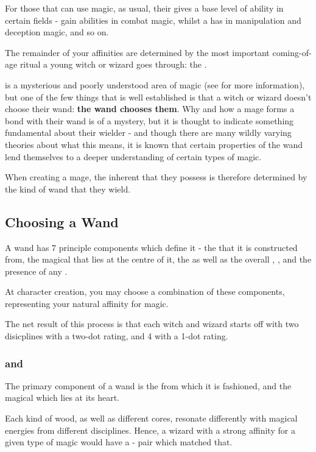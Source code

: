 For those that can use magic, as usual, their  gives a base level of ability in certain fields -  gain abilities in combat magic, whilst a  has  in manipulation and deception magic, and so on. 

The remainder of your affinities are determined by the most important coming-of-age ritual a young witch or wizard goes through: the . 

 is a mysterious and poorly understood area of magic (see \pageref{S:Wandlore} for more information), but one of the few things that is well established is that a witch or wizard doesn't choose their wand: {\bf the wand chooses them}. Why and how a mage forms a bond with their wand is of a mystery, but it is thought to indicate something fundamental about their wielder - and though there are many wildly varying theories about what this means, it is known that certain properties of the wand lend themselves to a deeper understanding of certain types of magic. 

When creating a mage, the inherent  that they possess is therefore determined by the kind of wand that they wield. 

\subsection{Choosing a Wand}

A wand has 7 principle components which define it - the  that it is constructed from, the magical  that lies at the centre of it, the  as well as the overall , ,  and the presence of any . 

At character creation, you may choose a combination of these components, representing your natural affinity for magic. 

The net result of this process is that each witch and wizard starts off with two disicplines with a two-dot rating, and 4 with a 1-dot rating. 

\subsubsection{ and }

The primary component of a wand is the  from which it is fashioned, and the magical  which lies at its heart. 

Each kind of wood, as well as different cores, resonate differently with magical energies from different disciplines. Hence, a wizard with a strong affinity for a given type of magic would have a - pair which matched that. 

